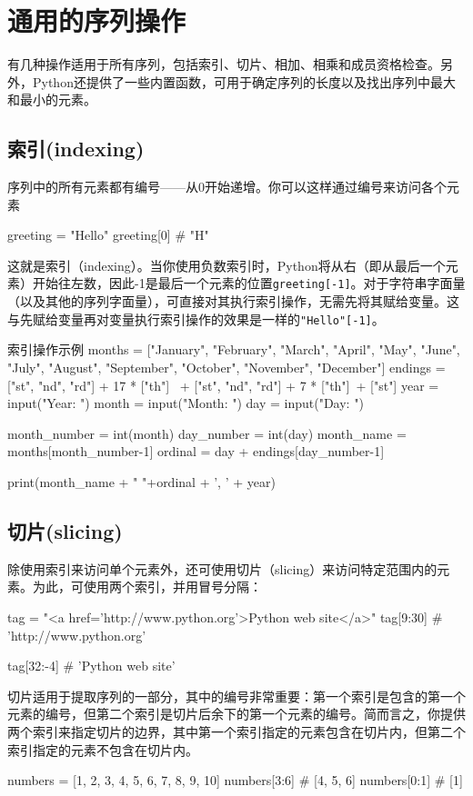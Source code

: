 \section{通用的序列操作}
有几种操作适用于所有序列，包括索引、切片、相加、相乘和成员资格检查。另外，Python还提供了一些内置函数，可用于确定序列的长度以及找出序列中最大和最小的元素。
\subsection{索引(indexing)}
序列中的所有元素都有编号——从0开始递增。你可以这样通过编号来访问各个元素
\begin{pyc}
greeting = "Hello"
greeting[0] # "H"
\end{pyc}
这就是索引（indexing）。当你使用负数索引时，Python将从右（即从最后一个元素）开始往左数，因此-1是最后一个元素的位置\verb|greeting[-1]|。对于字符串字面量（以及其他的序列字面量），可直接对其执行索引操作，无需先将其赋给变量。这与先赋给变量再对变量执行索引操作的效果是一样的\verb|"Hello"[-1]|。
\begin{py}{索引操作示例}
months = ["January", "February", "March", "April", "May", "June",
    "July", "August", "September", "October", "November", "December"]
endings = ["st", "nd", "rd"] + 17 * ["th"] \
+ ["st", "nd", "rd"] + 7 * ["th"]\
+ ["st"]
year = input("Year: ")
month = input("Month: ")
day = input("Day: ")

month_number = int(month)
day_number = int(day)
month_name = months[month_number-1]
ordinal = day + endings[day_number-1]

print(month_name + " "+ordinal + ', ' + year)
\end{py}

\subsection{切片(slicing)}
除使用索引来访问单个元素外，还可使用切片（slicing）来访问特定范围内的元素。为此，可使用两个索引，并用冒号分隔：
\begin{pyc}
tag = "<a href='http://www.python.org'>Python web site</a>"
tag[9:30]  # 'http://www.python.org'

tag[32:-4]  # 'Python web site'
\end{pyc}

切片适用于提取序列的一部分，其中的编号非常重要：第一个索引是包含的第一个元素的编号，但第二个索引是切片后余下的第一个元素的编号。简而言之，你提供两个索引来指定切片的边界，其中第一个索引指定的元素包含在切片内，但第二个索引指定的元素不包含在切片内。
\begin{pyc}
numbers = [1, 2, 3, 4, 5, 6, 7, 8, 9, 10]
numbers[3:6]  # [4, 5, 6]
numbers[0:1]  # [1]
\end{pyc}

